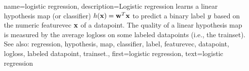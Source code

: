 {name={logistic regression}, 
	description={Logistic \gls{regression} learns a 
		linear \gls{hypothesis} \gls{map} (or \gls{classifier}) $h({\bf x}) = {\bf w}^{T} {\bf x}$ 
		to predict a binary \gls{label} $y$ based on the numeric \gls{featurevec} ${\bf x}$ of 
		a \gls{datapoint}. The quality of a linear \gls{hypothesis} \gls{map} is measured by the average \gls{logloss} 
		on some \glspl{labeled datapoint} (i.e., the \gls{trainset}).
				\\
		See also: \gls{regression}, \gls{hypothesis}, \gls{map}, \gls{classifier}, \gls{label}, \gls{featurevec}, \gls{datapoint}, \gls{logloss}, \gls{labeled datapoint}, \gls{trainset}.},
		first={logistic regression},
		text={logistic regression}
}
	
